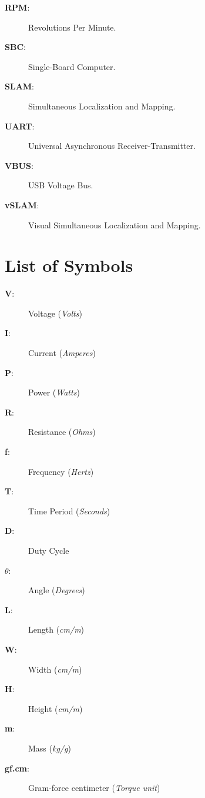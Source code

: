 \begin{description}
    \item[\textbf{RPM}:] Revolutions Per Minute. \label{term:rpm}
    \item[\textbf{SBC}:] Single-Board Computer. \label{term:sbc}
    \item[\textbf{SLAM}:] Simultaneous Localization and Mapping. \label{term:slam}
    \item[\textbf{UART}:] Universal Asynchronous Receiver-Transmitter. \label{term:uart}
    \item[\textbf{VBUS}:] USB Voltage Bus. \label{term:vbus}
    \item[\textbf{vSLAM}:] Visual Simultaneous Localization and Mapping. \label{term:vslam}
\end{description}
\clearpage


\chapter*{List of Symbols}
\begin{description}
    \item[\textbf{V}:] Voltage (\textit{Volts})
    \item[\textbf{I}:] Current (\textit{Amperes})
    \item[\textbf{P}:] Power (\textit{Watts})
    \item[\textbf{R}:] Resistance (\textit{Ohms})
    \item[\textbf{f}:] Frequency (\textit{Hertz})
    \item[\textbf{T}:] Time Period (\textit{Seconds})
    \item[\textbf{D}:] Duty Cycle
    \item[\textbf{$\theta$}:] Angle (\textit{Degrees})
    \item[\textbf{L}:] Length (\textit{cm/m})
    \item[\textbf{W}:] Width (\textit{cm/m})
    \item[\textbf{H}:] Height (\textit{cm/m})
    \item[\textbf{m}:] Mass (\textit{kg/g})
    \item[\textbf{gf.cm}:] Gram-force centimeter (\textit{Torque unit})
\end{description}
\clearpage
